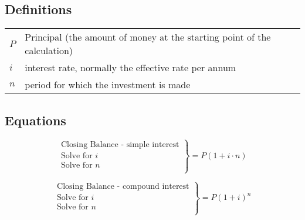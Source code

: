 \documentclass[10pt,a4paper,titlepage,twoside,openright]{report}
\begin{document}
\subsection{Definitions}
\begin{tabular}{ll}
$P$ &Principal (the amount of money at the starting point of the calculation)\\
$i$ &interest rate, normally the effective rate per annum\\
$n$ &period for which the investment is made\\
\end{tabular}

\subsection{Equations}
\begin{equation*}
\left.\begin{array}{l}
\mbox{Closing Balance - simple interest}\\
\mbox{Solve for $i$}\\
\mbox{Solve for $n$}\\
\end{array}\right\}= P (1 + i \cdot n)
\end{equation*}

\begin{equation*}
\left.\begin{array}{l}
\mbox{Closing Balance - compound interest}\\
\mbox{Solve for $i$}\\
\mbox{Solve for $n$}\\
\end{array}\right\}= P (1+i)^n
\end{equation*}

\end{document}
